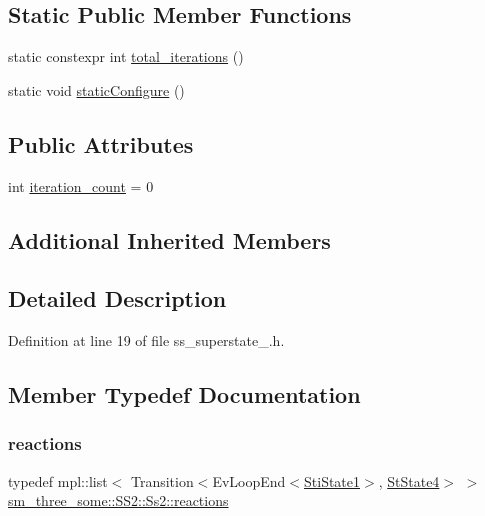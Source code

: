 \subsection*{Static Public Member Functions}
\begin{DoxyCompactItemize}
\item 
static constexpr int \hyperlink{structsm__three__some_1_1SS2_1_1Ss2_a40a682abb6bcacffdc2886c531aa8e10}{total\+\_\+iterations} ()
\item 
static void \hyperlink{structsm__three__some_1_1SS2_1_1Ss2_a6c51acd334a35a374d101d8d3dae7317}{static\+Configure} ()
\end{DoxyCompactItemize}
\subsection*{Public Attributes}
\begin{DoxyCompactItemize}
\item 
int \hyperlink{structsm__three__some_1_1SS2_1_1Ss2_ad0f43df403bcb029afb07a0f52699c60}{iteration\+\_\+count} = 0
\end{DoxyCompactItemize}
\subsection*{Additional Inherited Members}


\subsection{Detailed Description}


Definition at line 19 of file ss\+\_\+superstate\+\_.\+h.



\subsection{Member Typedef Documentation}
\mbox{\label{structsm__three__some_1_1SS2_1_1Ss2_a7b8b6caf125da7746c3158cee533442b}} 
\subsubsection{\texorpdfstring{reactions}{reactions}}
{\footnotesize\ttfamily typedef mpl\+::list$<$ Transition$<$Ev\+Loop\+End$<$\hyperlink{structsm__three__some_1_1inner__states_1_1StiState1}{Sti\+State1}$>$, \hyperlink{structsm__three__some_1_1StState4}{St\+State4}$>$ $>$ \hyperlink{structsm__three__some_1_1SS2_1_1Ss2_a7b8b6caf125da7746c3158cee533442b}{sm\+\_\+three\+\_\+some\+::\+S\+S2\+::\+Ss2\+::reactions}}



